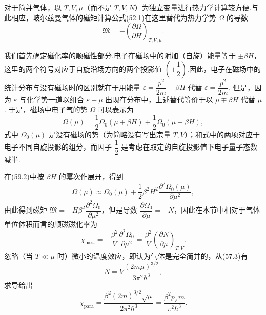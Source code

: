 对于简并气体，以 $T,V,\mu$（而不是 $T,V,N$）为独立变量进行热力学计算较方便.与此相应，玻尔兹曼气体的磁矩计算公式(52.1)在这里替代为热力学势 $\Omega$ 的导数
\begin{equation}
  \mathfrak{M}=-\left(\frac{\partial\Omega}{\partial H}\right)_{T,V,\mu}.
\end{equation}

我们首先确定磁化率的顺磁性部分.电子在磁场中的附加（自旋）能量等于 $\pm\beta H$，这里的两个符号对应于自旋沿场方向的两个投影值 $\left(\pm\dfrac{1}{2}\right)$.因此，电子在磁场中的统计分布与没有磁场时的区别就在于用能量 $\varepsilon=\dfrac{p^2}{2m}\pm\beta H$ 代替 $\varepsilon=\dfrac{p^2}{2m}$. 但是，因为 $\varepsilon$ 与化学势一道以组合 $\varepsilon-\mu$ 出现在分布中，上述替代等价于以 $\mu\mp\beta H$ 代替 $\mu$. 于是，磁场中电子气的势 $\Omega$ 可以表示为
\begin{equation}
  \Omega(\mu)=\frac{1}{2}\Omega_0(\mu+\beta H)+\frac{1}{2}\Omega_0(\mu-\beta H),
\end{equation}
式中 $\Omega_0(\mu)$ 是没有磁场的势（为简略没有写出宗量 $T,V$）；和式中的两项对应于电子不同自旋投影的组分，而因子 $\dfrac{1}{2}$ 是考虑在取定的自旋投影值下电子量子态数减半.

在(59.2)中按 $\beta H$ 的幂次作展开，得到
\begin{equation}
  \Omega(\mu)\approx\Omega_0(\mu)+\frac{1}{2}\beta^2H^2
  \frac{\partial^2\Omega_0(\mu)}{\partial\mu^2},
\end{equation}
由此得到磁矩 $\mathfrak{M}=-H\beta^2\dfrac{\partial^2\Omega_0}{\partial\mu^2}$，但是导数 $\dfrac{\partial\Omega_0}{\partial\mu}=-N$，因此在本节中相对于气体单位体积而言的顺磁磁化率为
\begin{equation}
  \chi_{\mathrm{para}}=-\frac{\beta^2}{V}\frac{\partial^2\Omega_0}{\partial\mu^2}
  =\frac{\beta^2}{V}\left(\frac{\partial N}{\partial\mu}\right)_{T,V}.
\end{equation}
忽略（当 $T\ll\mu$ 时）微小的温度效应，即认为气体是完全简并的，从(57.3)有
\begin{equation*}
  N=V\frac{(2m\mu)^{3/2}}{3\pi^2\hbar^3},
\end{equation*}
求导给出
\begin{equation}
  \chi_{\mathrm{para}}=\frac{\beta^2(2m)^{3/2}\sqrt{\mu}}{2\pi^2\hbar^3}
  =\frac{\beta^2p_Fm}{\pi^2\hbar^3}.
\end{equation}

